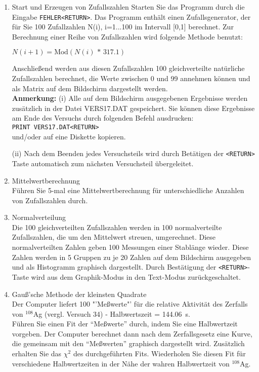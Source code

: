 \begin{enumerate}

\item Start und Erzeugen von Zufallszahlen \newline
Starten Sie das Programm durch die Eingabe \verb|FEHLER<RETURN>|. Das
Programm enthält einen Zufallsgenerator, der für Sie 100 Zufallzahlen
N(i), i=1...100 im Intervall [0,1] berechnet. Zur Berechnung einer
Reihe von Zufallszahlen wird folgende Methode benutzt:

\hspace{2cm} $N(i+1) = \mbox{Mod}(N(i)\,*\,317.1)$

Anschließend werden aus diesen Zufallszahlen 100 gleichverteilte
natürliche Zufallszahlen berechnet, die Werte zwischen 0 und 99
annehmen können und als Matrix auf dem Bildschirm dargestellt werden.\\
{\bf Anmerkung:} (i) Alle auf dem Bildschirm ausgegebenen Ergebnisse
werden zusätzlich in der Datei VERS17.DAT gespeichert. Sie können diese
Ergebnisse am Ende des Versuchs durch folgenden Befehl ausdrucken:\\

\hspace{2cm} \verb|PRINT VERS17.DAT<RETURN>|\\

und/oder auf eine Diskette kopieren.

(ii) Nach dem Beenden jedes Versuchsteils wird durch Betätigen der
\verb|<RETURN>| Taste automatisch zum nächsten Versuchsteil
übergeleitet.

\item Mittelwertberechnung\\
Führen Sie 5-mal eine Mittelwertberechnung für unterschiedliche
Anzahlen von Zufallszahlen durch.

\item Normalverteilung\\
Die 100 gleichverteilten Zufallszahlen werden in 100 normalverteilte
Zufallszahlen, die um den Mittelwert streuen, umgerechnet. Diese
normalverteilten Zahlen geben 100 Messungen einer Stablänge wieder.
Diese Zahlen werden in 5 Gruppen zu je 20 Zahlen auf dem Bildschirm
ausgegeben und als Histogramm graphisch dargestellt. Durch
Bestätigung der \verb|<RETURN>|-Taste wird aus dem Graphik-Modus in
den Text-Modus zurückgeschaltet.

\item Gauß'sche Methode der kleinsten Quadrate\\
Der Computer liefert 100 "'Meßwerte"' für die relative Aktivität des
Zerfalls von $^{108}$Ag (vergl. Versuch 34) - Halbwertszeit =
144.06~s.\\ Führen Sie einen Fit der ``Meßwerte'' durch, indem Sie eine
Halbwertzeit vorgeben. Der Computer berechnet dann nach dem
Zerfallsgesetz eine Kurve, die gemeinsam mit den ``Meßwerten''
graphisch dargestellt wird. Zusätzlich erhalten Sie das $\chi^{2}$ des
durchgeführten Fits. Wiederholen Sie diesen Fit für verschiedene
Halbwertzeiten in der Nähe der wahren Halbwertzeit von $^{108}$Ag.


\end{enumerate}
